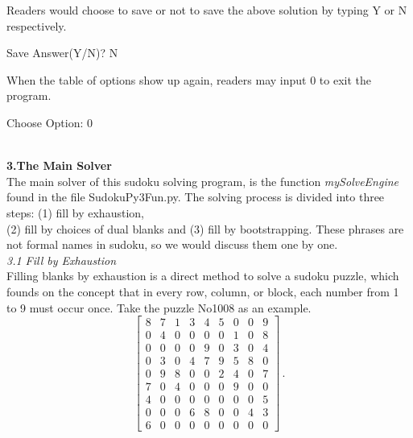 \documentclass{article}[12pt,a4paper]
\begin{document}
Readers would choose to save or not to save the above solution by typing Y or N respectively.
\begin{center} {\color{blue} Save Answer(Y/N)?} N \end{center}
When the table of options show up again, readers may input 0 to exit the program. 
\begin{center}  {\color{blue} Choose Option:} 0 \end{center}
\vspace*{2pt}

\hrulefill \\[2pt]

{\bf 3.The Main Solver} \\[4pt]
The main solver of this sudoku solving program, is the function {\it mySolveEngine} found in 
the file SudokuPy3Fun.py. The solving process is divided into three steps: (1) fill by exhaustion, \\
(2) fill by choices of dual blanks and (3) fill by bootstrapping. These phrases are not formal names in sudoku, 
so we would discuss them one by one. \\[4pt]

{\it 3.1 Fill by Exhaustion} \\[4pt]
Filling blanks by exhaustion is a direct method to solve a sudoku puzzle, which founds on the concept that 
in every row, column, or block, each number from 1 to 9 must occur once. Take the puzzle No1008 as an example.\\
\[ \left [ \begin{array}{ccc|ccc|ccc}
8 & 7 & 1 & 3 & 4 & 5 & 0 & 0 & 9 \\[-0.05in]
0 & 4 & 0 & 0 & 0 & 0 & 1 & 0 & 8 \\[-0.05in]
0 & 0 & 0 & 0 & 9 & 0 & 3 & 0 & 4 \\[-0.05in] \hline
0 & 3 & 0 & 4 & 7 & 9 & 5 & 8 & 0 \\[-0.05in]
0 & 9 & 8 & 0 & 0 & 2 & 4 & 0 & 7 \\[-0.05in]
7 & 0 & 4 & 0 & 0 & 0 & 9 & 0 & 0 \\[-0.05in] \hline
4 & 0 & 0 & 0 & 0 & 0 & 0 & 0 & 5 \\[-0.05in]
0 & 0 & 0 & 6 & 8 & 0 & 0 & 4 & 3 \\[-0.05in]
6 & 0 & 0 & 0 & 0 & 0 & 0 & 0 & 0 
\end{array} \right] \, .\]
\vspace*{4pt}
\end{document}
